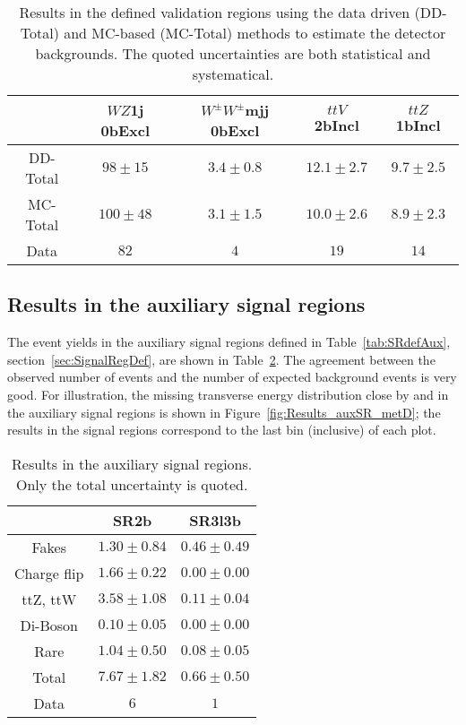 \begin{table}[htb!]
\caption{Results in the defined validation regions using the data driven (DD-Total) and MC-based (MC-Total) methods to estimate the detector backgrounds. The quoted uncertainties are both statistical and systematical.}
\label{tab:Results_VR_allCh_Comparison}
\begin{center}
\begin{tabular}{|c|cccc|}
      \hline
      \hline
         & $WZ$1j 0bExcl & $W^\pm W^{\pm}$mjj 0bExcl & $ttV$ 2bIncl & $ttZ$ 1bIncl\\\hline
           DD-Total & $98 \pm 15$ & $3.4 \pm 0.8$ & $12.1 \pm 2.7$ & $9.7 \pm 2.5$\\
          MC-Total &   $ 100 \pm 48$ & $ 3.1 \pm 1.5$ & $ 10.0\pm 2.6$ & $ 8.9 \pm 2.3$ \\\hline  
             Data  &   $82$ &   $4$       & $19$  & $14$    \\\hline\hline
\end{tabular}%
\end{center}
\end{table}   



\subsection{Results in the auxiliary signal regions}
\label{subs:Results_AuxSR}
The event yields in the auxiliary signal regions defined in Table~\ref{tab:SRdefAux}, section~\ref{sec:SignalRegDef}, are shown in Table~\ref{tab:Results_auxiliarySR}. The agreement between the observed number of events and the number of expected background events is very good. For illustration, the missing transverse energy distribution close by and in the auxiliary signal regions is shown in Figure~\ref{fig:Results_auxSR_metD}; the results in the signal regions correspond to the last bin (inclusive) of each plot. 

\begin{table}[htb!]
\caption{Results in the auxiliary signal regions. Only the total uncertainty is quoted.}
\label{tab:Results_auxiliarySR}
\begin{center}
\begin{tabular}{|c|cc|} 
\hline\hline
 & SR2b & SR3l3b\\\hline
  Fakes & $1.30 \pm 0.84$ & $0.46 \pm 0.49$ \\
 Charge flip & $1.66 \pm 0.22$ & $0.00 \pm 0.00$ \\
  ttZ, ttW & $3.58 \pm 1.08$ & $0.11 \pm 0.04$ \\
  Di-Boson & $0.10 \pm 0.05$ & $0.00 \pm 0.00$ \\
 Rare & $1.04 \pm 0.50$ & $0.08 \pm 0.05$ \\\hline
 Total & $7.67 \pm 1.82$ & $0.66 \pm 0.50$ \\
Data & $6  $ & $1  $ \\\hline
\end{tabular}
\end{center}
\end{table}   

